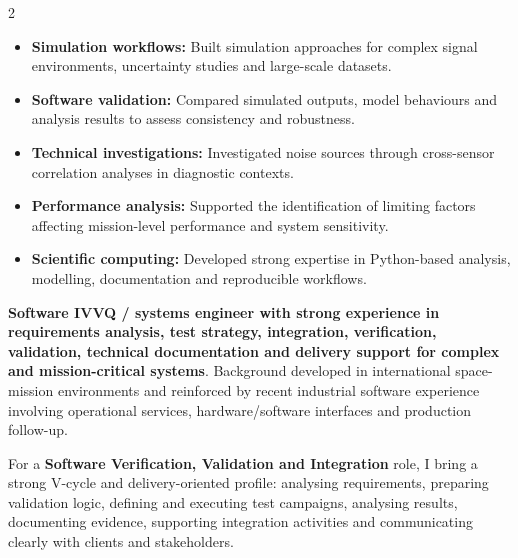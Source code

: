 \documentclass[8pt,a4paper,ragged2e,withhyper]{altacv}
\begin{document}
\begin{paracol}{2}
\begin{itemize}
  \item \textbf{Simulation workflows:} Built simulation approaches for complex signal environments, uncertainty studies and large-scale datasets.
  \item \textbf{Software validation:} Compared simulated outputs, model behaviours and analysis results to assess consistency and robustness.
  \item \textbf{Technical investigations:} Investigated noise sources through cross-sensor correlation analyses in diagnostic contexts.
  \item \textbf{Performance analysis:} Supported the identification of limiting factors affecting mission-level performance and system sensitivity.
  \item \textbf{Scientific computing:} Developed strong expertise in Python-based analysis, modelling, documentation and reproducible workflows.
\end{itemize}



\switchcolumn


\textbf{Software IVVQ / systems engineer with strong experience in requirements analysis, test strategy, integration, verification, validation, technical documentation and delivery support for complex and mission-critical systems}. Background developed in international space-mission environments and reinforced by recent industrial software experience involving operational services, hardware/software interfaces and production follow-up.

For a \textbf{Software Verification, Validation and Integration} role, I bring a strong V-cycle and delivery-oriented profile: analysing requirements, preparing validation logic, defining and executing test campaigns, analysing results, documenting evidence, supporting integration activities and communicating clearly with clients and stakeholders.


\end{paracol}
\end{document}
